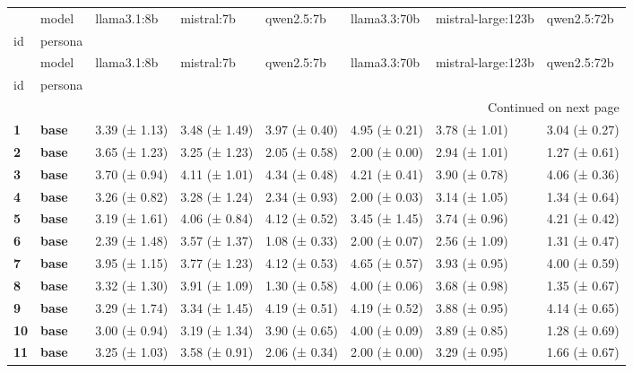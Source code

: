 \begin{longtable}{llllllll}
\toprule
 & model & llama3.1:8b & mistral:7b & qwen2.5:7b & llama3.3:70b & mistral-large:123b & qwen2.5:72b \\
id & persona &  &  &  &  &  &  \\
\midrule
\endfirsthead
\toprule
 & model & llama3.1:8b & mistral:7b & qwen2.5:7b & llama3.3:70b & mistral-large:123b & qwen2.5:72b \\
id & persona &  &  &  &  &  &  \\
\midrule
\endhead
\midrule
\multicolumn{8}{r}{Continued on next page} \\
\midrule
\endfoot
\bottomrule
\endlastfoot
\textbf{1} & \textbf{base} & 3.39 (± 1.13) & 3.48 (± 1.49) & 3.97 (± 0.40) & 4.95 (± 0.21) & 3.78 (± 1.01) & 3.04 (± 0.27) \\
\cline{1-8}
\textbf{2} & \textbf{base} & 3.65 (± 1.23) & 3.25 (± 1.23) & 2.05 (± 0.58) & 2.00 (± 0.00) & 2.94 (± 1.01) & 1.27 (± 0.61) \\
\cline{1-8}
\textbf{3} & \textbf{base} & 3.70 (± 0.94) & 4.11 (± 1.01) & 4.34 (± 0.48) & 4.21 (± 0.41) & 3.90 (± 0.78) & 4.06 (± 0.36) \\
\cline{1-8}
\textbf{4} & \textbf{base} & 3.26 (± 0.82) & 3.28 (± 1.24) & 2.34 (± 0.93) & 2.00 (± 0.03) & 3.14 (± 1.05) & 1.34 (± 0.64) \\
\cline{1-8}
\textbf{5} & \textbf{base} & 3.19 (± 1.61) & 4.06 (± 0.84) & 4.12 (± 0.52) & 3.45 (± 1.45) & 3.74 (± 0.96) & 4.21 (± 0.42) \\
\cline{1-8}
\textbf{6} & \textbf{base} & 2.39 (± 1.48) & 3.57 (± 1.37) & 1.08 (± 0.33) & 2.00 (± 0.07) & 2.56 (± 1.09) & 1.31 (± 0.47) \\
\cline{1-8}
\textbf{7} & \textbf{base} & 3.95 (± 1.15) & 3.77 (± 1.23) & 4.12 (± 0.53) & 4.65 (± 0.57) & 3.93 (± 0.95) & 4.00 (± 0.59) \\
\cline{1-8}
\textbf{8} & \textbf{base} & 3.32 (± 1.30) & 3.91 (± 1.09) & 1.30 (± 0.58) & 4.00 (± 0.06) & 3.68 (± 0.98) & 1.35 (± 0.67) \\
\cline{1-8}
\textbf{9} & \textbf{base} & 3.29 (± 1.74) & 3.34 (± 1.45) & 4.19 (± 0.51) & 4.19 (± 0.52) & 3.88 (± 0.95) & 4.14 (± 0.65) \\
\cline{1-8}
\textbf{10} & \textbf{base} & 3.00 (± 0.94) & 3.19 (± 1.34) & 3.90 (± 0.65) & 4.00 (± 0.09) & 3.89 (± 0.85) & 1.28 (± 0.69) \\
\cline{1-8}
\textbf{11} & \textbf{base} & 3.25 (± 1.03) & 3.58 (± 0.91) & 2.06 (± 0.34) & 2.00 (± 0.00) & 3.29 (± 0.95) & 1.66 (± 0.67) \\

\end{longtable}
